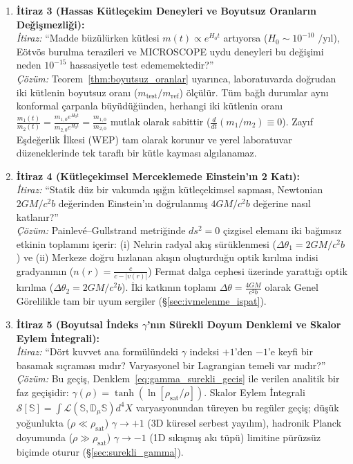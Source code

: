 \begin{enumerate}
    \item \textbf{İtiraz 3 (Hassas Kütleçekim Deneyleri ve Boyutsuz Oranların Değişmezliği):} \\
          \textit{İtiraz:} ``Madde büzülürken kütlesi $m(t) \propto e^{H_0 t}$ artıyorsa ($H_0 \sim 10^{-10}\text{ /yıl}$), Eötvös burulma terazileri ve MICROSCOPE uydu deneyleri bu değişimi neden $10^{-15}$ hassasiyetle test edememektedir?'' \\
          \textit{Çözüm:} Teorem~\ref{thm:boyutsuz_oranlar} uyarınca, laboratuvarda doğrudan iki kütlenin boyutsuz oranı ($m_{\mathrm{test}}/m_{\mathrm{ref}}$) ölçülür. Tüm bağlı durumlar aynı konformal çarpanla büyüdüğünden, herhangi iki kütlenin oranı $\frac{m_1(t)}{m_2(t)} = \frac{m_{1,0} e^{H_0 t}}{m_{2,0} e^{H_0 t}} = \frac{m_{1,0}}{m_{2,0}}$ mutlak olarak sabittir ($\frac{d}{dt}(m_1/m_2) \equiv 0$). Zayıf Eşdeğerlik İlkesi (WEP) tam olarak korunur ve yerel laboratuvar düzeneklerinde tek taraflı bir kütle kayması algılanamaz.

    \item \textbf{İtiraz 4 (Kütleçekimsel Merceklemede Einstein'ın 2 Katı):} \\
          \textit{İtiraz:} ``Statik düz bir vakumda ışığın kütleçekimsel sapması, Newtonian $2GM/c^2 b$ değerinden Einstein'ın doğrulanmış $4GM/c^2 b$ değerine nasıl katlanır?'' \\
          \textit{Çözüm:} Painlev\'e--Gullstrand metriğinde $ds^2 = 0$ çizgisel elemanı iki bağımsız etkinin toplamını içerir: (i) Nehrin radyal akış sürüklenmesi ($\Delta\theta_1 = 2GM/c^2 b$) ve (ii) Merkeze doğru hızlanan akışın oluşturduğu optik kırılma indisi gradyanının ($n(r) = \frac{c}{c - |v(r)|}$) Fermat dalga cephesi üzerinde yarattığı optik kırılma ($\Delta\theta_2 = 2GM/c^2 b$). İki katkının toplamı $\Delta\theta = \frac{4GM}{c^2 b}$ olarak Genel Görelilikle tam bir uyum sergiler (\S\ref{sec:ivmelenme_ispat}).

    \item \textbf{İtiraz 5 (Boyutsal İndeks $\gamma$'nın Sürekli Doyum Denklemi ve Skalor Eylem İntegrali):} \\
          \textit{İtiraz:} ``Dört kuvvet ana formülündeki $\gamma$ indeksi $+1$'den $-1$'e keyfi bir basamak sıçraması mıdır? Varyasyonel bir Lagrangian temeli var mıdır?'' \\
          \textit{Çözüm:} Bu geçiş, Denklem~\eqref{eq:gamma_surekli_gecis} ile verilen analitik bir faz geçişidir: $\gamma(\rho) = \tanh(\ln[\rho_{\mathrm{sat}}/\rho])$. Skalor Eylem İntegrali $\mathcal{S}[\mathbb{S}] = \int \mathcal{L}(\mathbb{S}, \mathbb{D}_\mu \mathbb{S}) d^4X$ varyasyonundan türeyen bu regüler geçiş; düşük yoğunlukta ($\rho \ll \rho_{\mathrm{sat}}$) $\gamma \to +1$ (3D küresel serbest yayılım), hadronik Planck doyumunda ($\rho \gg \rho_{\mathrm{sat}}$) $\gamma \to -1$ (1D sıkışmış akı tüpü) limitine pürüzsüz biçimde oturur (\S\ref{sec:surekli_gamma}).


\end{enumerate}
